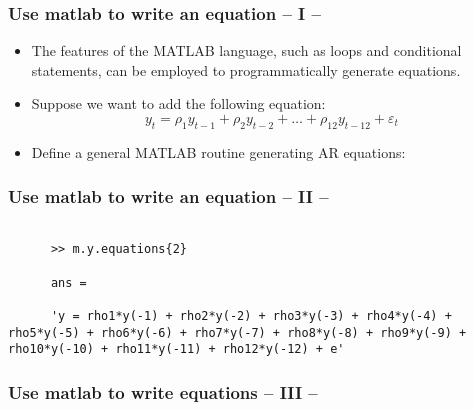 \documentclass[10pt,slidestop]{beamer}
\theoremstyle{plain}
\begin{document}
\begin{frame}[c,fragile]
  \frametitle{Use matlab to write an equation -- I --}

  \begin{itemize}

  \item The features of the MATLAB language, such as loops and conditional statements, can be employed to programmatically generate equations.\newline

  \item Suppose we want to add the following equation:
    \[
      y_t = \rho_1 y_{t-1} + \rho_2 y_{t-2} + \dots + \rho_{12} y_{t-12} + \varepsilon_t
    \]

    \medskip

  \item Define a general MATLAB routine generating AR equations:\newline

    

  \end{itemize}

\end{frame}


\begin{frame}[c,fragile]
  \frametitle{Use matlab to write an equation -- II --}

  

  \bigskip

  \begin{lstlisting}[style=MatlabConsole]

      >> m.y.equations{2}

      ans =

      'y = rho1*y(-1) + rho2*y(-2) + rho3*y(-3) + rho4*y(-4) + rho5*y(-5) + rho6*y(-6) + rho7*y(-7) + rho8*y(-8) + rho9*y(-9) + rho10*y(-10) + rho11*y(-11) + rho12*y(-12) + e'
  \end{lstlisting}

\end{frame}


\begin{frame}[c,fragile]
  \frametitle{Use matlab to write equations -- III --}

  

\end{frame}
\end{document}
